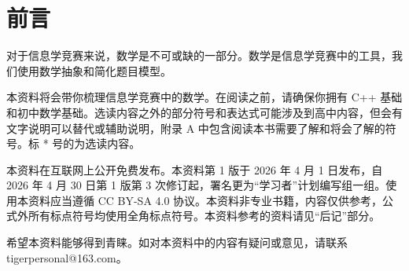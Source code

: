 \chapter{前言}

对于信息学竞赛来说，数学是不可或缺的一部分。数学是信息学竞赛中的工具，我们使用数学抽象和简化题目模型。

本资料将会带你梳理信息学竞赛中的数学。在阅读之前，请确保你拥有 C++ 基础和初中数学基础。选读内容之外的部分符号和表达式可能涉及到高中内容，但会有文字说明可以替代或辅助说明，附录 A 中包含阅读本书需要了解和将会了解的符号。标 * 号的为选读内容。

本资料在互联网上公开免费发布。本资料第 1 版于 2026 年 4 月 1 日发布，自 2026 年 4 月 30 日第 1 版第 3 次修订起，署名更为“学习者”计划编写组一组。使用本资料应当遵循 CC BY-SA 4.0 协议。本资料非专业书籍，内容仅供参考，公式外所有标点符号均使用全角标点符号。本资料参考的资料请见“后记”部分。

希望本资料能够得到青睐。如对本资料中的内容有疑问或意见，请联系 tigerpersonal@163.com。